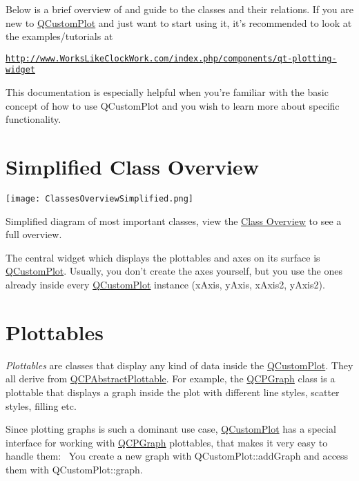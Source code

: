 Below is a brief overview of and guide to the classes and their relations. If you are new to \hyperlink{a00030_d8/d00/a00186}{Q\+Custom\+Plot} and just want to start using it, it's recommended to look at the examples/tutorials at

\href{http://www.WorksLikeClockWork.com/index.php/components/qt-plotting-widget}{\tt http\+://www.\+Works\+Like\+Clock\+Work.\+com/index.\+php/components/qt-\/plotting-\/widget}

This documentation is especially helpful when you're familiar with the basic concept of how to use Q\+Custom\+Plot and you wish to learn more about specific functionality.\hypertarget{index_simpleoverview}{}\section{Simplified Class Overview}\label{index_simpleoverview}

\begin{DoxyImageNoCaption}
  \mbox{\texttt{[image: ClassesOverviewSimplified.png]}}
\end{DoxyImageNoCaption}
  \begin{center}Simplified diagram of most important classes, view the \hyperlink{a00002}{Class Overview} to see a full overview.\end{center} 

The central widget which displays the plottables and axes on its surface is \hyperlink{a00030_d8/d00/a00186}{Q\+Custom\+Plot}. Usually, you don't create the axes yourself, but you use the ones already inside every \hyperlink{a00030_d8/d00/a00186}{Q\+Custom\+Plot} instance (x\+Axis, y\+Axis, x\+Axis2, y\+Axis2).\hypertarget{index_plottables}{}\section{Plottables}\label{index_plottables}
{\itshape Plottables} are classes that display any kind of data inside the \hyperlink{a00030_d8/d00/a00186}{Q\+Custom\+Plot}. They all derive from \hyperlink{a00024}{Q\+C\+P\+Abstract\+Plottable}. For example, the \hyperlink{a00031}{Q\+C\+P\+Graph} class is a plottable that displays a graph inside the plot with different line styles, scatter styles, filling etc.

Since plotting graphs is such a dominant use case, \hyperlink{a00030_d8/d00/a00186}{Q\+Custom\+Plot} has a special interface for working with \hyperlink{a00031}{Q\+C\+P\+Graph} plottables, that makes it very easy to handle them\+:~\newline
You create a new graph with Q\+Custom\+Plot\+::add\+Graph and access them with Q\+Custom\+Plot\+::graph.

